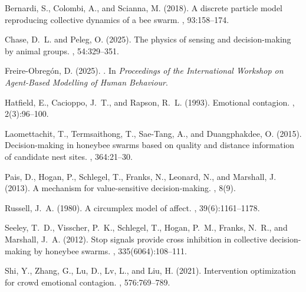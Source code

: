 \documentclass[a4paper,twoside]{article}
\begin{document}

{\small
\begin{thebibliography}{}

Bernardi, S., Colombi, A., and Scianna, M. (2018).
\newblock A discrete particle model reproducing collective dynamics of a bee swarm.
, 93:158--174.

Chase, D.~L. and Peleg, O. (2025).
\newblock The physics of sensing and decision-making by animal groups.
, 54:329--351.

Freire-Obreg{\'o}n, D. (2025).
.
\newblock In {\em Proceedings of the International Workshop on Agent-Based Modelling of Human Behaviour}.

Hatfield, E., Cacioppo, J.~T., and Rapson, R.~L. (1993).
\newblock Emotional contagion.
, 2(3):96--100.

Laomettachit, T., Termsaithong, T., Sae-Tang, A., and Duangphakdee, O. (2015).
\newblock Decision-making in honeybee swarms based on quality and distance information of candidate nest sites.
, 364:21--30.

Pais, D., Hogan, P., Schlegel, T., Franks, N., Leonard, N., and Marshall, J. (2013).
\newblock A mechanism for value-sensitive decision-making.
, 8(9).

Russell, J.~A. (1980).
\newblock A circumplex model of affect.
, 39(6):1161--1178.

Seeley, T.~D., Visscher, P.~K., Schlegel, T., Hogan, P.~M., Franks, N.~R., and Marshall, J.~A. (2012).
\newblock Stop signals provide cross inhibition in collective decision-making by honeybee swarms.
, 335(6064):108–111.

Shi, Y., Zhang, G., Lu, D., Lv, L., and Liu, H. (2021).
\newblock Intervention optimization for crowd emotional contagion.
, 576:769--789.


\end{thebibliography}}
\end{document}
